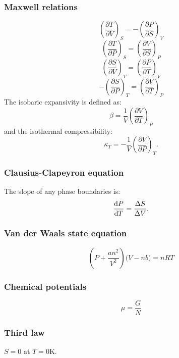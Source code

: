 \documentclass{article}
\begin{document}
\begin{multicols*}{3}
\subsubsection*{Maxwell relations}
$$\left(\frac{\partial T}{\partial V}\right)_S=-\left(\frac{\partial P}{\partial S}\right)_V$$
$$\left(\frac{\partial T}{\partial P}\right)_S=\left(\frac{\partial V}{\partial S}\right)_P$$
$$\left(\frac{\partial S}{\partial V}\right)_T=\left(\frac{\partial P}{\partial T}\right)_V$$
$$-\left(\frac{\partial S}{\partial P}\right)_T=\left(\frac{\partial V}{\partial T}\right)_P$$
The isobaric expansivity is defined as:
$$\beta=\frac{1}{V}
\left(\frac{\partial V}{\partial T}\right)_P$$
and the isothermal compressibility:
$$\kappa_T=-\frac{1}{V}
\left(\frac{\partial V}{\partial P}\right)_T.$$

\newpage

\subsubsection*{Clausius-Clapeyron equation}
The slope of any phase boundaries is:
$$\dv{P}{T}=\frac{\Delta S}{\Delta V}.$$

\subsubsection*{Van der Waals state equation}
$$\left(P+\frac{an^2}{V^2}\right)
\bigl(V-nb\bigr)=nRT$$

\subsubsection*{Chemical potentials}
$$\mu=\frac{G}{N}$$

\subsubsection*{Third law}
$S=0$ at $T=0$K.

\end{multicols*}
\end{document}
